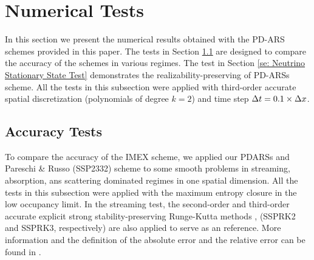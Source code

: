 \section{Numerical Tests}\label{se:NumericalTests}

In this section we present the numerical results obtained with the PD-ARS schemes provided in this paper.
The tests in Section \ref{se: Accuracy Tests} are designed to compare the accuracy of the schemes in various regimes.
The test in Section \ref{se: Neutrino Stationary State Test} demonstrates the realizability-preserving of PD-ARSs scheme.
All the tests in this subsection were applied with third-order accurate spatial discretization (polynomials of degree $k=2$) and time step $\Delta t = 0.1 \times \Delta x $.
\subsection{Accuracy Tests}
\label{se: Accuracy Tests}
To compare the accuracy of the IMEX scheme, we applied our PDARSs and Pareschi \& Russo \cite{pareschiRusso_2005} (SSP2332) scheme to some smooth problems in streaming, absorption, ans scattering dominated regimes in one spatial dimension.
All the tests in this subsection were applied with the maximum entropy closure in the low occupancy limit.
In the streaming test, the second-order and third-order accurate explicit strong stability-preserving Runge-Kutta methods\cite{gottlieb_etal_2001} , (SSPRK2 and SSPRK3, respectively) are also applied to serve as an reference.
More information and the definition of the absolute error and the relative error can be found in \cite{chu_etal_2018}.

